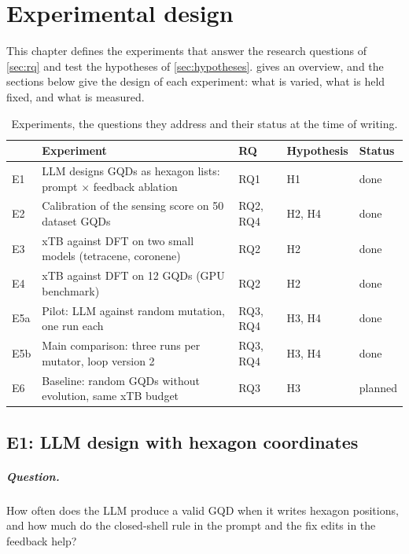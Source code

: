 \chapter{Experimental design}
\label{ch:experiments}

This chapter defines the experiments that answer the research questions of \cref{sec:rq} and test
the hypotheses of \cref{sec:hypotheses}.  gives an overview, and the
sections below give the design of each experiment: what is varied, what is held fixed, and what
is measured.

\begin{table}[ht]
  \centering
  \caption{Experiments, the questions they address and their status at the time of writing.}
  \label{tab:experiments}
  \small
  \begin{tabularx}{\textwidth}{@{}lLlll@{}}
    \toprule
    & Experiment & RQ & Hypothesis & Status \\
    \midrule
    E1 & LLM designs GQDs as hexagon lists: prompt \(\times\) feedback ablation & RQ1 & H1 & done \\
    E2 & Calibration of the sensing score on 50 dataset GQDs & RQ2, RQ4 & H2, H4 & done \\
    E3 & xTB against DFT on two small models (tetracene, coronene) & RQ2 & H2 & done \\
    E4 & xTB against DFT on 12 GQDs (GPU benchmark) & RQ2 & H2 & done \\
    E5a & Pilot: LLM against random mutation, one run each & RQ3, RQ4 & H3, H4 & done \\
    E5b & Main comparison: three runs per mutator, loop version 2 & RQ3, RQ4 & H3, H4 & done \\
    E6 & Baseline: random GQDs without evolution, same xTB budget & RQ3 & H3 & planned \\
    \bottomrule
  \end{tabularx}
\end{table}

\section{E1: LLM design with hexagon coordinates}
\label{sec:e1}

\paragraph{Question.} How often does the LLM produce a valid GQD when it writes hexagon positions,
and how much do the closed-shell rule in the prompt and the fix edits in the feedback help?

